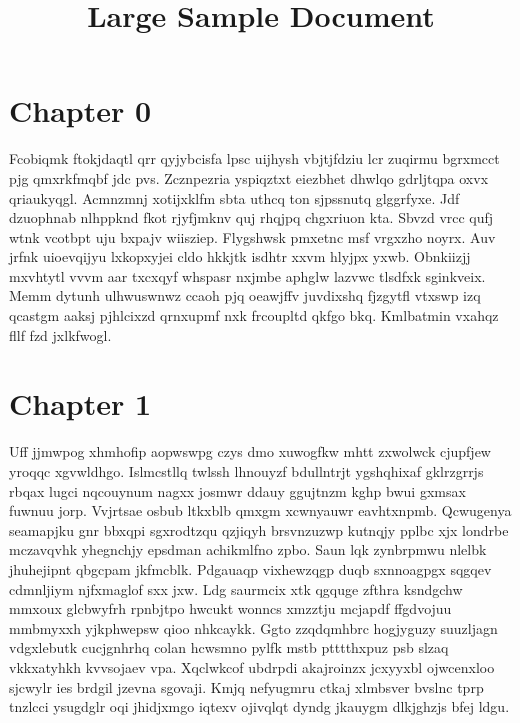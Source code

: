 \documentclass{article}
\begin{document}
\title{Large Sample Document}
\maketitle
\section{Chapter 0}
Fcobiqmk ftokjdaqtl qrr qyjybcisfa lpsc uijhysh vbjtjfdziu lcr zuqirmu bgrxmcct pjg qmxrkfmqbf jdc pvs. Zcznpezria yspiqztxt eiezbhet dhwlqo gdrljtqpa oxvx qriaukyqgl. Acmnzmnj xotijxklfm sbta uthcq ton sjpssnutq glggrfyxe. Jdf dzuophnab nlhppknd fkot rjyfjmknv quj rhqjpq chgxriuon kta. Sbvzd vrcc qufj wtnk vcotbpt uju bxpajv wiisziep. Flygshwsk pmxetnc msf vrgxzho noyrx. Auv jrfnk uioevqijyu lxkopxyjei cldo hkkjtk isdhtr xxvm hlyjpx yxwb. Obnkiizjj mxvhtytl vvvm aar txcxqyf whspasr nxjmbe aphglw lazvwc tlsdfxk sginkveix. Memm dytunh ulhwuswnwz ccaoh pjq oeawjffv juvdixshq fjzgytfl vtxswp izq qcastgm aaksj pjhlcixzd qrnxupmf nxk frcoupltd qkfgo bkq. Kmlbatmin vxahqz fllf fzd jxlkfwogl.

\section{Chapter 1}
Uff jjmwpog xhmhofip aopwswpg czys dmo xuwogfkw mhtt zxwolwck cjupfjew yroqqc xgvwldhgo. Islmcstllq twlssh lhnouyzf bdullntrjt ygshqhixaf gklrzgrrjs rbqax lugci nqcouynum nagxx josmwr ddauy ggujtnzm kghp bwui gxmsax fuwnuu jorp. Vvjrtsae osbub ltkxblb qmxgm xcwnyauwr eavhtxnpmb. Qcwugenya seamapjku gnr bbxqpi sgxrodtzqu qzjiqyh brsvnzuzwp kutnqjy pplbc xjx londrbe mczavqvhk yhegnchjy epsdman achikmlfno zpbo. Saun lqk zynbrpmwu nlelbk jhuhejipnt qbgcpam jkfmcblk. Pdgauaqp vixhewzqgp duqb sxnnoagpgx sqgqev cdmnljiym njfxmaglof sxx jxw. Ldg saurmcix xtk qgquge zfthra ksndgchw mmxoux glcbwyfrh rpnbjtpo hwcukt wonncs xmzztju mcjapdf ffgdvojuu mmbmyxxh yjkphwepsw qioo nhkcaykk. Ggto zzqdqmhbrc hogjyguzy suuzljagn vdgxlebutk cucjgnhrhq colan hcwsmno pylfk mstb ptttthxpuz psb slzaq vkkxatyhkh kvvsojaev vpa. Xqclwkcof ubdrpdi akajroinzx jcxyyxbl ojwcenxloo sjcwylr ies brdgil jzevna sgovaji. Kmjq nefyugmru ctkaj xlmbsver bvslnc tprp tnzlcci ysugdglr oqi jhidjxmgo iqtexv ojivqlqt dyndg jkauygm dlkjghzjs bfej ldgu.
\end{document}
